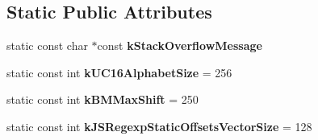 \subsection*{Static Public Attributes}
\begin{DoxyCompactItemize}
\item 
static const char $\ast$const {\bfseries k\+Stack\+Overflow\+Message}
\item 
\hypertarget{classv8_1_1internal_1_1_isolate_a3af6e148b51e8342a70d3c06e9cb837f}{}static const int {\bfseries k\+U\+C16\+Alphabet\+Size} = 256\label{classv8_1_1internal_1_1_isolate_a3af6e148b51e8342a70d3c06e9cb837f}

\item 
\hypertarget{classv8_1_1internal_1_1_isolate_a3d909a4000f32615b675f2007878d3fa}{}static const int {\bfseries k\+B\+M\+Max\+Shift} = 250\label{classv8_1_1internal_1_1_isolate_a3d909a4000f32615b675f2007878d3fa}

\item 
\hypertarget{classv8_1_1internal_1_1_isolate_ae21f1b76aadb93d7e1ac1c9eaaf07b6e}{}static const int {\bfseries k\+J\+S\+Regexp\+Static\+Offsets\+Vector\+Size} = 128\label{classv8_1_1internal_1_1_isolate_ae21f1b76aadb93d7e1ac1c9eaaf07b6e}

\end{DoxyCompactItemize}
